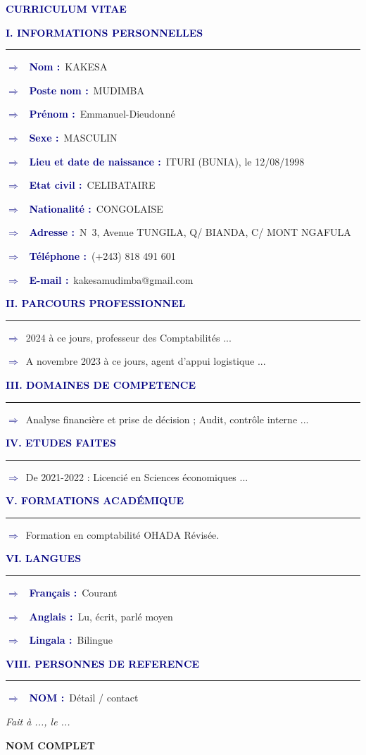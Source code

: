 \documentclass[11pt,a4paper]{article}
\newcommand{\sectioncv}[1]{%
  \vspace{6pt}%
  \noindent\textcolor{navy}{\textbf{\large #1}}%
  \par\noindent\textcolor{navy}{\rule{\linewidth}{0.6pt}}%
  \vspace{2pt}%
}
\newcommand{\puce}[1]{%
  \noindent\textcolor{navy}{\textbf{\Large\ensuremath{\Rightarrow}}}~#1\par%
}
\newcommand{\ligne}[2]{%
  \noindent\textcolor{navy}{\textbf{\Large\ensuremath{\Rightarrow}}}~%
  \textcolor{navy}{\textbf{#1 :}}~#2\par%
}
\begin{document}
\begin{center}
  {\Large\bfseries\textcolor{navy}{CURRICULUM VITAE}}
\end{center}
\vspace{6pt}

\sectioncv{I. INFORMATIONS PERSONNELLES}
\ligne{Nom}{KAKESA}
\ligne{Poste nom}{MUDIMBA}
\ligne{Pr\'enom}{Emmanuel-Dieudonn\'e}
\ligne{Sexe}{MASCULIN}
\ligne{Lieu et date de naissance}{ITURI (BUNIA), le 12/08/1998}
\ligne{Etat civil}{CELIBATAIRE}
\ligne{Nationalit\'e}{CONGOLAISE}
\ligne{Adresse}{N\textdegree\ 3, Avenue TUNGILA, Q/ BIANDA, C/ MONT NGAFULA}
\ligne{T\'el\'ephone}{(+243) 818 491 601}
\ligne{E-mail}{kakesamudimba@gmail.com}

\sectioncv{II. PARCOURS PROFESSIONNEL}
\puce{2024 \`a ce jours, professeur des Comptabilit\'es ...}
\puce{A novembre 2023 \`a ce jours, agent d'appui logistique ...}

\sectioncv{III. DOMAINES DE COMPETENCE}
\puce{Analyse financi\`ere et prise de d\'ecision ; Audit, contr\^ole interne ...}

\sectioncv{IV. ETUDES FAITES}
\puce{De 2021-2022 : Licenci\'e en Sciences \'economiques ...}

\sectioncv{V. FORMATIONS ACAD\'EMIQUE}
\puce{Formation en comptabilit\'e OHADA R\'evis\'ee.}

\sectioncv{VI. LANGUES}
\ligne{Fran\c{c}ais}{Courant}
\ligne{Anglais}{Lu, \'ecrit, parl\'e moyen}
\ligne{Lingala}{Bilingue}

\sectioncv{VIII. PERSONNES DE REFERENCE}
\ligne{NOM}{D\'etail / contact}

\vspace{14pt}
\hfill\textit{Fait \`a ..., le ...}\par
\hfill\textbf{NOM COMPLET}
\end{document}
